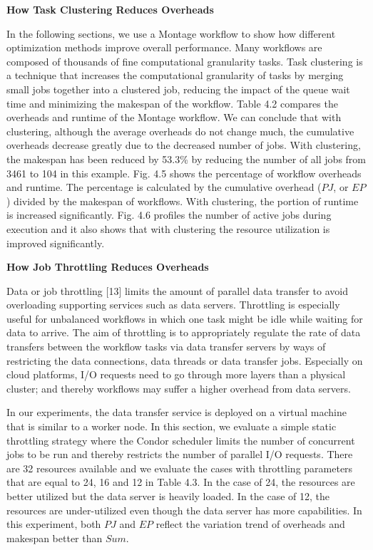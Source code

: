 \textbf{How Task Clustering Reduces Overheads}

In the following sections, we use a Montage workflow to show how different optimization methods improve overall performance. Many workflows are composed of thousands of fine computational granularity tasks. Task clustering is a technique that increases the computational granularity of tasks by merging small jobs together into a clustered job, reducing the impact of the queue wait time and minimizing the makespan of the workflow. Table 4.2 compares the overheads and runtime of the Montage workflow. We can conclude that with clustering, although the average overheads do not change much, the cumulative overheads decrease greatly due to the decreased number of jobs. With clustering, the makespan has been reduced by 53.3\% by reducing the number of all jobs from 3461 to 104 in this example. Fig. 4.5 shows the percentage of workflow overheads and runtime. The percentage is calculated by the cumulative overhead ($PJ$, or $EP$) divided by the makespan of workflows. With clustering, the portion of runtime is increased significantly. Fig. 4.6 profiles the number of active jobs during execution and it also shows that with clustering the resource utilization is improved significantly. 

\textbf{How Job Throttling Reduces Overheads}

Data or job throttling [13] limits the amount of parallel data transfer to avoid overloading supporting services such as data servers. Throttling is especially useful for unbalanced workflows in which one task might be idle while waiting for data to arrive. The aim of throttling is to appropriately regulate the rate of data transfers between the workflow tasks via data transfer servers by ways of restricting the data connections, data threads or data transfer jobs. Especially on cloud platforms, I/O requests need to go through more layers than a physical cluster; and thereby workflows may suffer a higher overhead from data servers.

In our experiments, the data transfer service is deployed on a virtual machine that is similar to a worker node.  In this section, we evaluate a simple static throttling strategy where the Condor scheduler limits the number of concurrent jobs to be run and thereby restricts the number of parallel I/O requests. There are 32 resources available and we evaluate the cases with throttling parameters that are equal to 24, 16 and 12 in Table 4.3. In the case of 24, the resources are better utilized but the data server is heavily loaded. In the case of 12, the resources are under-utilized even though the data server has more capabilities. In this experiment, both $PJ$ and $EP$ reflect the variation trend of overheads and makespan better than $Sum$. 

